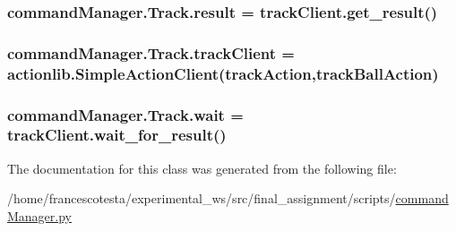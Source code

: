 \subsubsection[{\texorpdfstring{result}{result}}]{\setlength{\rightskip}{0pt plus 5cm}command\+Manager.\+Track.\+result = track\+Client.\+get\+\_\+result()\hspace{0.3cm}{\ttfamily [static]}}\hypertarget{classcommandManager_1_1Track_aa66fb1baab2433c729df0919ba0989a7}{}\label{classcommandManager_1_1Track_aa66fb1baab2433c729df0919ba0989a7}
\subsubsection[{\texorpdfstring{track\+Client}{trackClient}}]{\setlength{\rightskip}{0pt plus 5cm}command\+Manager.\+Track.\+track\+Client = actionlib.\+Simple\+Action\+Client(\textquotesingle{}track\+Action\textquotesingle{},track\+Ball\+Action)\hspace{0.3cm}{\ttfamily [static]}}\hypertarget{classcommandManager_1_1Track_a4a57e4e548d9213c4623f5d528753b1f}{}\label{classcommandManager_1_1Track_a4a57e4e548d9213c4623f5d528753b1f}
\subsubsection[{\texorpdfstring{wait}{wait}}]{\setlength{\rightskip}{0pt plus 5cm}command\+Manager.\+Track.\+wait = track\+Client.\+wait\+\_\+for\+\_\+result()\hspace{0.3cm}{\ttfamily [static]}}\hypertarget{classcommandManager_1_1Track_a8f86bbb5fd3d92749c09d5e876a1d1a6}{}\label{classcommandManager_1_1Track_a8f86bbb5fd3d92749c09d5e876a1d1a6}


The documentation for this class was generated from the following file\+:\begin{DoxyCompactItemize}
\item 
/home/francescotesta/experimental\+\_\+ws/src/final\+\_\+assignment/scripts/\hyperlink{commandManager_8py}{command\+Manager.\+py}\end{DoxyCompactItemize}
